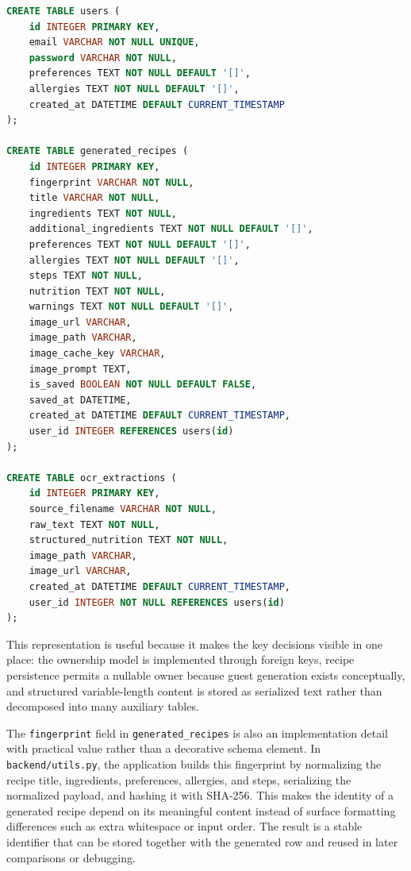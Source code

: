 \begin{lstlisting}[language=SQL,caption={Representative relational DDL for the implemented schema},label={lst:ddl-schema}]
CREATE TABLE users (
    id INTEGER PRIMARY KEY,
    email VARCHAR NOT NULL UNIQUE,
    password VARCHAR NOT NULL,
    preferences TEXT NOT NULL DEFAULT '[]',
    allergies TEXT NOT NULL DEFAULT '[]',
    created_at DATETIME DEFAULT CURRENT_TIMESTAMP
);

CREATE TABLE generated_recipes (
    id INTEGER PRIMARY KEY,
    fingerprint VARCHAR NOT NULL,
    title VARCHAR NOT NULL,
    ingredients TEXT NOT NULL,
    additional_ingredients TEXT NOT NULL DEFAULT '[]',
    preferences TEXT NOT NULL DEFAULT '[]',
    allergies TEXT NOT NULL DEFAULT '[]',
    steps TEXT NOT NULL,
    nutrition TEXT NOT NULL,
    warnings TEXT NOT NULL DEFAULT '[]',
    image_url VARCHAR,
    image_path VARCHAR,
    image_cache_key VARCHAR,
    image_prompt TEXT,
    is_saved BOOLEAN NOT NULL DEFAULT FALSE,
    saved_at DATETIME,
    created_at DATETIME DEFAULT CURRENT_TIMESTAMP,
    user_id INTEGER REFERENCES users(id)
);

CREATE TABLE ocr_extractions (
    id INTEGER PRIMARY KEY,
    source_filename VARCHAR NOT NULL,
    raw_text TEXT NOT NULL,
    structured_nutrition TEXT NOT NULL,
    image_path VARCHAR,
    image_url VARCHAR,
    created_at DATETIME DEFAULT CURRENT_TIMESTAMP,
    user_id INTEGER NOT NULL REFERENCES users(id)
);
\end{lstlisting}

This representation is useful because it makes the key decisions
visible in one place: the ownership model is implemented through foreign
keys, recipe persistence permits a nullable owner because guest
generation exists conceptually, and structured variable-length content
is stored as serialized text rather than decomposed into many auxiliary
tables.

The \texttt{fingerprint} field in \texttt{generated\_recipes} is also an
implementation detail with practical value rather than a decorative
schema element. In \texttt{backend/utils.py}, the application builds
this fingerprint by normalizing the recipe title, ingredients,
preferences, allergies, and steps, serializing the normalized payload,
and hashing it with SHA-256. This makes the identity
of a generated recipe depend on its meaningful content instead of
surface formatting differences such as extra whitespace or input order.
The result is a stable identifier that can be stored together with the
generated row and reused in later comparisons or debugging.

